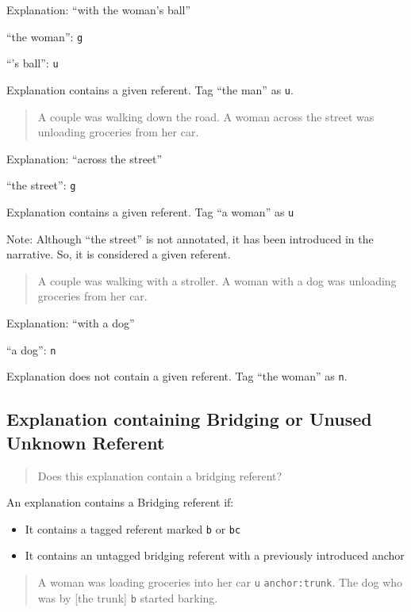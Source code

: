 \documentclass[
]{book}
\providecommand{\tightlist}{%
  \setlength{\itemsep}{0pt}\setlength{\parskip}{0pt}}
\begin{document}
Explanation: ``with the woman's ball''

``the woman'': \texttt{g}

``'s ball'': \texttt{u}

Explanation contains a given referent.
Tag ``the man'' as \texttt{u}.

\begin{quote}
A couple was walking down the road.
A woman across the street was unloading groceries from her car.
\end{quote}

Explanation: ``across the street''

``the street'': \texttt{g}

Explanation contains a given referent.
Tag ``a woman'' as \texttt{u}

Note: Although ``the street'' is not annotated, it has been introduced in the narrative.
So, it is considered a given referent.

\begin{quote}
A couple was walking with a stroller.
A woman with a dog was unloading groceries from her car.
\end{quote}

Explanation: ``with a dog''

``a dog'': \texttt{n}

Explanation does not contain a given referent.
Tag ``the woman'' as \texttt{n}.

\hypertarget{explanation-containing-bridging-or-unused-unknown-referent}{%
\subsection{Explanation containing Bridging or Unused Unknown Referent}\label{explanation-containing-bridging-or-unused-unknown-referent}}

\begin{quote}
Does this explanation contain a bridging referent?
\end{quote}

An explanation contains a Bridging referent if:

\begin{itemize}
\tightlist
\item
  It contains a tagged referent marked \texttt{b} or \texttt{bc}
\item
  It contains an untagged bridging referent with a previously introduced anchor
\end{itemize}

\begin{quote}
A woman was loading groceries into her car \texttt{u} \texttt{anchor:trunk}.
The dog who was by {[}the trunk{]} \texttt{b} started barking.
\end{quote}
\end{document}
